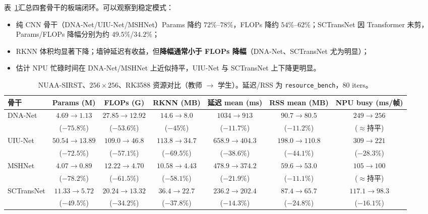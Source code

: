 \documentclass[lettersize,journal]{IEEEtran}
\begin{document}
表~\ref{tab:resource}汇总四套骨干的板端闭环。可以观察到稳定模式：
\begin{itemize}
\item 纯 CNN 骨干（DNA-Net/UIU-Net/MSHNet）Params 降约 $72\%$--$78\%$，FLOPs 降约 $54\%$--$62\%$；SCTransNet 因 Transformer 未剪，Params/FLOPs 降幅分别为约 $49.5\%$/$34.2\%$；
\item RKNN 体积均显著下降；墙钟延迟有收益，但\textbf{降幅通常小于 FLOPs 降幅}（DNA-Net、SCTransNet 尤为明显）；
\item 估计 NPU 忙碌时间在 DNA-Net/MSHNet 上近似持平，UIU-Net 与 SCTransNet 上下降更明显。
\end{itemize}

\begin{table}[!t]
\caption{NUAA-SIRST、$256\times256$、RK3588 资源对比（教师 $\rightarrow$ 学生）。延迟/RSS 为 \texttt{resource\_bench}，$80$ iters。}
\label{tab:resource}
\centering
\footnotesize
\begin{tabular}{|l|c|c|c|c|c|c|}
\hline
骨干 & Params (M) & FLOPs (G) & RKNN (MB) & 延迟 mean (ms) & RSS mean (MB) & NPU busy (ms/帧) \\
\hline
DNA-Net & $4.69\!\rightarrow\!1.13$ & $27.85\!\rightarrow\!12.92$ & $14.6\!\rightarrow\!8.0$ & $1034\!\rightarrow\!913$ & $90.7\!\rightarrow\!80.5$ & $249\!\rightarrow\!256$ \\
 & (\textbf{$-75.8\%$}) & (\textbf{$-53.6\%$}) & ($-45\%$) & (\textbf{$-11.7\%$}) & ($-11.2\%$) & ($\approx$持平) \\
\hline
UIU-Net & $50.54\!\rightarrow\!13.89$ & $109.0\!\rightarrow\!46.8$ & $113.8\!\rightarrow\!34.7$ & $658.9\!\rightarrow\!404.3$ & $198.0\!\rightarrow\!110.8$ & $309\!\rightarrow\!221$ \\
 & (\textbf{$-72.5\%$}) & (\textbf{$-57.1\%$}) & (\textbf{$-69.5\%$}) & (\textbf{$-38.6\%$}) & (\textbf{$-44.1\%$}) & (\textbf{$-28.3\%$}) \\
\hline
MSHNet & $4.07\!\rightarrow\!0.89$ & $12.22\!\rightarrow\!4.70$ & $10.58\!\rightarrow\!4.43$ & $478.9\!\rightarrow\!374.2$ & $59.6\!\rightarrow\!53.0$ & $105\!\rightarrow\!100$ \\
 & (\textbf{$-78.2\%$}) & (\textbf{$-61.5\%$}) & (\textbf{$-58.1\%$}) & (\textbf{$-21.9\%$}) & ($-11.1\%$) & ($\approx$持平) \\
\hline
SCTransNet & $11.33\!\rightarrow\!5.72$ & $20.24\!\rightarrow\!13.32$ & $36.4\!\rightarrow\!22.7$ & $236.2\!\rightarrow\!202.4$ & $87.4\!\rightarrow\!65.7$ & $117.1\!\rightarrow\!98.3$ \\
 & (\textbf{$-49.5\%$}) & (\textbf{$-34.2\%$}) & (\textbf{$-37.8\%$}) & (\textbf{$-14.3\%$}) & (\textbf{$-24.8\%$}) & (\textbf{$-16.1\%$}) \\
\hline
\end{tabular}
\end{table}
\end{document}
